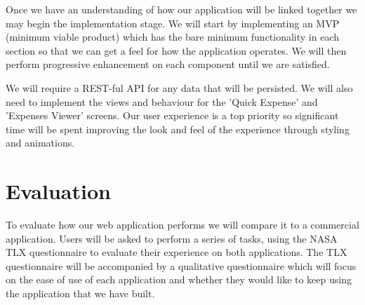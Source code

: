 \documentclass{chi2011}
\begin{document}
Once we have an understanding of how our application will be linked together we may begin the implementation stage. We
will start by implementing an MVP (minimum viable product) which has the bare minimum functionality in each section so
that we can get a feel for how the application operates. We will then perform progressive enhancement on each component
until we are satisfied.

We will require a REST-ful API for any data that will be persisted. We will also need to implement the views and
behaviour for the 'Quick Expense' and 'Expenses Viewer' screens. Our user experience is a top priority so 
significant time will be spent improving the look and feel of the experience through styling and animations.

\section{Evaluation}

To evaluate how our web application performs we will compare it to a commercial application. Users
will be asked to perform a series of tasks, using the NASA TLX questionnaire to evaluate their experience
on both applications. The TLX questionnaire will be accompanied by a qualitative questionnaire 
which will focus on the ease of use of each application and whether they would like to keep using the
application that we have built.
 
\end{document}
